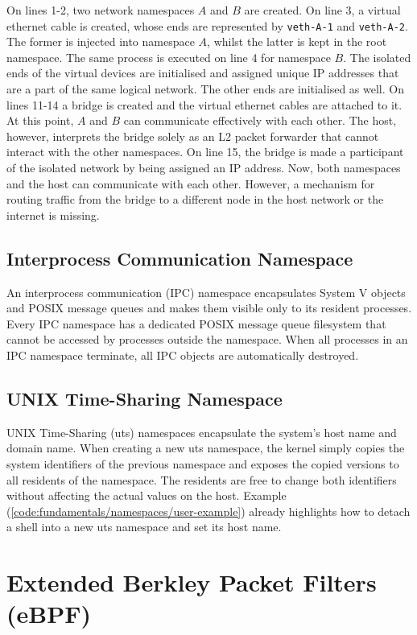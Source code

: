 On lines 1-2, two network namespaces $A$ and $B$ are created. On line 3, a virtual ethernet 
cable is created, whose ends are represented by \verb|veth-A-1| and \verb|veth-A-2|. The former 
is injected into namespace $A$, whilst the latter is kept in the root namespace. 
The same process is executed on line 4 for namespace $B$. The isolated ends of the 
virtual devices are initialised and assigned unique IP addresses that are a part of the same logical network.
The other ends are initialised as well. On lines 11-14 a bridge is created and the 
virtual ethernet cables are attached to it. At this point, $A$ and $B$ can communicate 
effectively with each other. The host, however, interprets the bridge solely as an L2 packet 
forwarder that cannot interact with the other namespaces. On line 15, the bridge
is made a participant of the isolated network by being assigned an IP address.
Now, both namespaces and the host can communicate with each other. 
However, a mechanism for routing traffic from the bridge to a different node in the 
host network or the internet is missing. 

\subsection{Interprocess Communication Namespace}
\label{sections:fundamentals/namespaces/ipc}
An interprocess communication (IPC) namespace encapsulates System V objects and POSIX 
message queues and makes them visible only to its resident processes.
Every IPC namespace has a dedicated POSIX message queue filesystem
that cannot be accessed by processes outside the namespace.
When all processes in an IPC namespace terminate, all IPC objects are automatically
destroyed. 

\subsection{UNIX Time-Sharing Namespace}
\label{sections:fundamentals/namespaces/uts}
UNIX Time-Sharing (uts) namespaces encapsulate the system's host name and domain name.
When creating a new uts namespace, the kernel simply copies the system identifiers of the 
previous namespace and exposes the copied versions to all residents of the namespace. 
The residents are free to change both identifiers without affecting the actual values 
on the host. Example (\ref{code:fundamentals/namespaces/user-example}) already highlights 
how to detach a shell into a new uts namespace and set its host name.

\section{Extended Berkley Packet Filters (eBPF)}
\label{sections:fundamentals/ebpf}